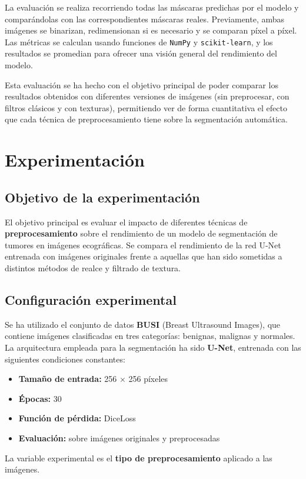 \documentclass[12pt]{article}
\begin{document}
La evaluación se realiza recorriendo todas las máscaras predichas por el modelo y comparándolas con las correspondientes máscaras reales. Previamente, ambas imágenes se binarizan, redimensionan si es necesario y se comparan píxel a píxel. Las métricas se calculan usando funciones de \texttt{NumPy} y \texttt{scikit-learn}, y los resultados se promedian para ofrecer una visión general del rendimiento del modelo.

Esta evaluación se ha hecho con el objetivo principal de poder comparar los resultados obtenidos con diferentes versiones de imágenes (sin preprocesar, con filtros clásicos y con texturas), permitiendo ver de forma cuantitativa el efecto que cada técnica de preprocesamiento tiene sobre la segmentación automática.

\section{Experimentación}

\subsection{Objetivo de la experimentación}
El objetivo principal es evaluar el impacto de diferentes técnicas de \textbf{preprocesamiento} sobre el rendimiento de un modelo de segmentación de tumores en imágenes ecográficas. Se compara el rendimiento de la red U-Net entrenada con imágenes originales frente a aquellas que han sido sometidas a distintos métodos de realce y filtrado de textura.

\subsection{Configuración experimental}
Se ha utilizado el conjunto de datos \textbf{BUSI} (Breast Ultrasound Images), que contiene imágenes clasificadas en tres categorías: benignas, malignas y normales. La arquitectura empleada para la segmentación ha sido \textbf{U-Net}, entrenada con las siguientes condiciones constantes:
\begin{itemize}
    \item \textbf{Tamaño de entrada:} 256 × 256 píxeles
    \item \textbf{Épocas:} 30
    \item \textbf{Función de pérdida:} DiceLoss
    \item \textbf{Evaluación:} sobre imágenes originales y preprocesadas
\end{itemize}
La variable experimental es el \textbf{tipo de preprocesamiento} aplicado a las imágenes.
\end{document}
